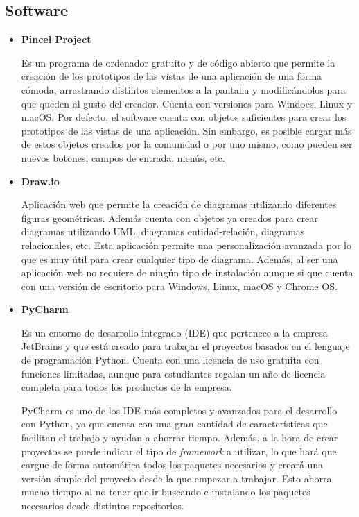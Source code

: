 \subsection{Software}
\begin{itemize}
\item\textbf{Pincel Project}

Es un programa de ordenador gratuito y de código abierto que permite la creación de los prototipos de las vistas de una aplicación de una forma cómoda, arrastrando distintos elementos a la pantalla y modificándolos para que queden al gusto del creador. 
Cuenta con versiones para Windoes, Linux y macOS.
Por defecto, el software cuenta con objetos suficientes para crear los prototipos de las vistas de una aplicación. 
Sin embargo, es posible cargar más de estos objetos creados por la comunidad o por uno mismo, como pueden ser nuevos botones, campos de entrada, menús, etc.

\item\textbf{Draw.io}

Aplicación web que permite la creación de diagramas utilizando diferentes figuras geométricas. 
Además cuenta con objetos ya creados para crear diagramas utilizando UML, diagramas entidad-relación, diagramas relacionales, etc. 
Esta aplicación permite una personalización avanzada por lo que es muy útil para crear cualquier tipo de diagrama. 
Además, al ser una aplicación web no requiere de ningún tipo de instalación aunque si que cuenta con una versión de escritorio para Windows, Linux, macOS y Chrome OS.

\item\textbf{PyCharm}

Es un entorno de desarrollo integrado (IDE) que pertenece a la empresa JetBrains y que está creado para trabajar el proyectos basados en el lenguaje de programación Python. 
Cuenta con una licencia de uso gratuita con funciones limitadas, aunque para estudiantes regalan un año de licencia completa para todos los productos de la empresa.

PyCharm es uno de los IDE más completos y avanzados para el desarrollo con Python, ya que cuenta con una gran cantidad de características que facilitan el trabajo y ayudan a ahorrar tiempo. 
Además, a la hora de crear proyectos se puede indicar el tipo de \textit{framework} a utilizar, lo que hará que cargue de forma automática todos los paquetes necesarios y creará una versión simple del proyecto desde la que empezar a trabajar. 
Esto ahorra mucho tiempo al no tener que ir buscando e instalando los paquetes necesarios desde distintos repositorios. 
\end{itemize}
\subsection{}
